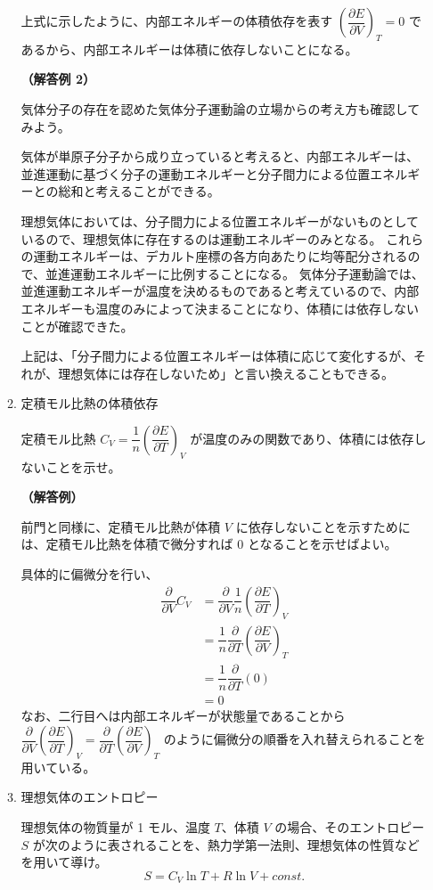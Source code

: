 \documentclass[uplatex,dvipdfmx,a4paper,11pt]{jsarticle}
\newcommand{\difp}[2]{\dfrac{\partial #1}{\partial #2}}
\begin{document}
\begin{appendix}
\begin{enumerate}
\begin{enumerate}
上式に示したように、内部エネルギーの体積依存を表す $\left(\dfrac{\partial E}{\partial V} \right)_T = 0$ であるから、内部エネルギーは体積に依存しないことになる。

{\bf （解答例 2）}

気体分子の存在を認めた気体分子運動論の立場からの考え方も確認してみよう。

気体が単原子分子から成り立っていると考えると、内部エネルギーは、並進運動に基づく分子の運動エネルギーと分子間力による位置エネルギーとの総和と考えることができる。

理想気体においては、分子間力による位置エネルギーがないものとしているので、理想気体に存在するのは運動エネルギーのみとなる。
これらの運動エネルギーは、デカルト座標の各方向あたりに均等配分されるので、並進運動エネルギーに比例することになる。
気体分子運動論では、並進運動エネルギーが温度を決めるものであると考えているので、内部エネルギーも温度のみによって決まることになり、体積には依存しないことが確認できた。

上記は、「分子間力による位置エネルギーは体積に応じて変化するが、それが、理想気体には存在しないため」と言い換えることもできる。

\item
定積モル比熱の体積依存

定積モル比熱 $C_V = \dfrac{1}{n} \left( \dfrac{\partial E}{\partial T} \right)_V$ が温度のみの関数であり、体積には依存しないことを示せ。

{\bf （解答例）}

前門と同様に、定積モル比熱が体積 $V$ に依存しないことを示すためには、定積モル比熱を体積で微分すれば 0 となることを示せばよい。

具体的に偏微分を行い、
\begin{align*}
\difp{}{V} C_V 
	&=\difp{}{V} \dfrac{1}{n} \left( \dfrac{\partial E}{\partial T} \right)_V \\
	&=\dfrac{1}{n} \difp{}{T} \left( \difp{E}{V} \right)_T \\
	&=\dfrac{1}{n} \difp{}{T} (0) \\
	&= 0
\end{align*}
なお、二行目へは内部エネルギーが状態量であることから $\difp{}{V} \left( \dfrac{\partial E}{\partial T} \right)_V=\difp{}{T} \left( \difp{E}{V} \right)_T$ のように偏微分の順番を入れ替えられることを用いている。

\item
理想気体のエントロピー

理想気体の物質量が 1 モル、温度 $T$、体積 $V$ の場合、そのエントロピー $S$ が次のように表されることを、熱力学第一法則、理想気体の性質などを用いて導け。
\[S = C_V \ln T + R \ln V + const. \]


\end{enumerate}
\end{enumerate}
\end{appendix}
\end{document}
